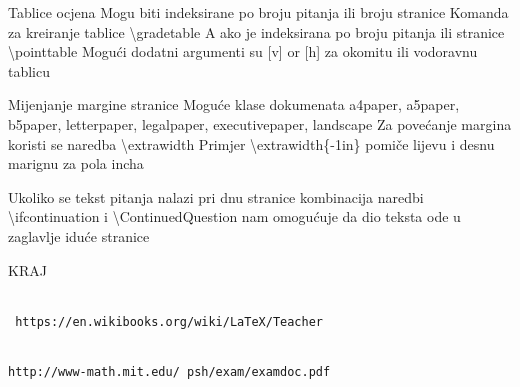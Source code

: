 \documentclass[addpoints,answers]{beamer}
\begin{document}
\begin{frame}{Tablice ocjena}
Mogu biti indeksirane po broju pitanja ili broju stranice
\newline
Komanda za kreiranje tablice \color{blue}
\textbackslash{gradetable}
\newline
\color{black}
A ako je indeksirana po broju pitanja ili stranice \color{blue} \textbackslash{pointtable}
\color{black}
\newline
Mogući dodatni argumenti su [v] or [h] za okomitu ili vodoravnu tablicu
\end{frame}

\begin{frame}{Mijenjanje margine stranice}
Moguće klase dokumenata \color{blue} a4paper, a5paper, b5paper, letterpaper, legalpaper, executivepaper, landscape\color{black}
\newline
Za povećanje margina koristi se naredba \color{blue} \textbackslash{extrawidth}
\color{black}
\newline
Primjer \color{blue}\textbackslash{extrawidth\{-1in\}} \color{black}
pomiče lijevu i desnu marignu za pola incha


\end{frame}

\begin{frame}
Ukoliko se tekst pitanja nalazi pri dnu stranice kombinacija naredbi \color{blue} \textbackslash{ifcontinuation} \color{black} i \color{blue} \textbackslash{ContinuedQuestion} \color{black}nam omogućuje da dio teksta ode u zaglavlje iduće stranice

\end{frame}
\begin{frame}
\begin{center}
     \color{red} {\huge KRAJ}
\end{center}


\end{frame}

\begin{thebibliography}{2}

\\\texttt{ https://en.wikibooks.org/wiki/LaTeX/Teacher}

 


\\\texttt{http://www-math.mit.edu/~psh/exam/examdoc.pdf}
\end{thebibliography}
\end{document}
